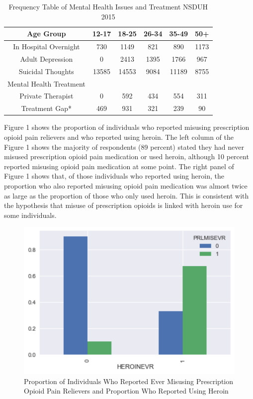 \documentclass[sigconf]{acmart}
\begin{document}
\begin{table}
  \caption{Frequency Table of Mental Health Issues and Treatment NSDUH 2015
  \cite{samhsa16}}
  \label{tab:freq}
  \begin{tabular}{cccccc}
    \toprule
    Age Group & 12-17& 18-25& 26-34& 35-49& 50+\\
    \midrule
    In Hospital Overnight& 730& 1149& 821& 890& 1173 \\
    Adult Depression& 0& 2413& 1395& 1766& 967 \\
    Suicidal Thoughts& 13585& 14553& 9084& 11189& 8755 \\
    \midrule
    Mental Health Treatment& & & & & \\
    \midrule
    Private Therapist& 0& 592& 434& 554& 311 \\
    Treatment Gap*& 469& 931& 321& 239& 90 \\
    \bottomrule
  \end{tabular}
\end{table}


Figure 1 shows the proportion of individuals who reported misusing prescription 
opioid pain relievers and who reported using heroin. The left column of the 
Figure 1 shows the majority of respondents (89 percent) stated they had never 
misused prescription opioid pain medication or used heroin, although 10 percent 
reported misusing opioid pain medication at some point. The right panel of 
Figure 1 shows that, of those individuals who reported using heroin, the 
proportion who also reported misusing opioid pain medication was almost twice 
as large as the proportion of those who only used heroin. This is consistent 
with the hypothesis that misuse of prescription opioids is linked with heroin 
use for some individuals.

\begin{figure}[!ht]
  \centering\includegraphics[width=\columnwidth]{images/Figure1.pdf}
  \caption{Proportion of Individuals Who Reported Ever Misusing Prescription
  Opioid Pain Relievers and Proportion Who Reported Using Heroin}
  \label{f:Figure1}
\end{figure}
\end{document}
